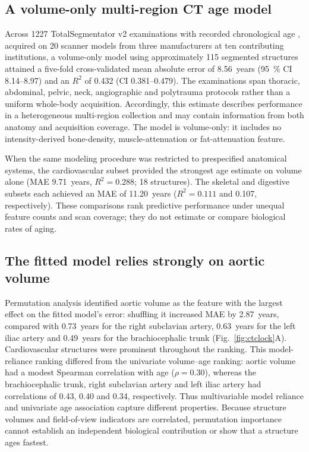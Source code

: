 \documentclass[11pt]{article}
\begin{document}

\subsection{A volume-only multi-region CT age model}

Across \num{1227} TotalSegmentator v2 examinations with recorded chronological
age \citep{wasserthal2023totalsegmentator}, acquired on \num{20} scanner models
from three manufacturers at ten contributing institutions, a volume-only model
using approximately \num{115} segmented structures attained a five-fold
cross-validated mean absolute error of \num{8.56}~years
(\SI{95}{\percent} CI \numrange{8.14}{8.97}) and an $R^2$ of \num{0.432}
(CI \numrange{0.381}{0.479}). The examinations span thoracic, abdominal,
pelvic, neck, angiographic and polytrauma protocols rather than a uniform
whole-body acquisition. Accordingly, this estimate describes performance in a
heterogeneous multi-region collection and may contain information from both
anatomy and acquisition coverage. The model is volume-only: it includes no
intensity-derived bone-density, muscle-attenuation or fat-attenuation feature.

When the same modeling procedure was restricted to prespecified anatomical
systems, the cardiovascular subset provided the strongest age estimate on
volume alone (MAE \num{9.71}~years, $R^2=\num{0.288}$; \num{18} structures).
The skeletal and digestive subsets each achieved an MAE of \num{11.20}~years
($R^2=\num{0.111}$ and \num{0.107}, respectively). These comparisons rank
predictive performance under unequal feature counts and scan coverage; they do
not estimate or compare biological rates of aging.

\subsection{The fitted model relies strongly on aortic volume}

Permutation analysis identified aortic volume as the feature with the largest
effect on the fitted model's error: shuffling it increased MAE by
\num{2.87}~years, compared with \num{0.73}~years for the right subclavian
artery, \num{0.63}~years for the left iliac artery and \num{0.49}~years for the
brachiocephalic trunk (Fig.~\ref{fig:ctclock}A). Cardiovascular structures were
prominent throughout the ranking. This model-reliance ranking differed from
the univariate volume--age ranking: aortic volume had a modest Spearman
correlation with age ($\rho=\num{0.30}$), whereas the brachiocephalic trunk,
right subclavian artery and left iliac artery had correlations of
\num{0.43}, \num{0.40} and \num{0.34}, respectively. Thus multivariable model
reliance and univariate age association capture different properties. Because
structure volumes and field-of-view indicators are correlated, permutation
importance cannot establish an independent biological contribution or show
that a structure ages fastest.
\end{document}
